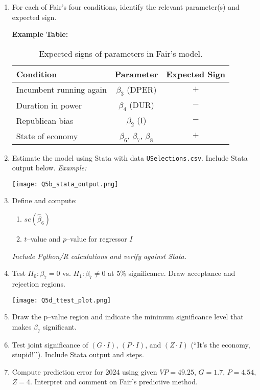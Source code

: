\documentclass[12pt,a4paper]{article}
\begin{document}
\begin{enumerate}[label=(\alph*)]
  \item For each of Fair’s four conditions, identify the relevant parameter(s) and expected sign.

  \textbf{Example Table:}
  \begin{table}[h!]\centering
  \begin{tabular}{lcc}
  \hline
  Condition & Parameter & Expected Sign \\
  \hline
  Incumbent running again & $\beta_3$ (DPER) & $+$ \\
  Duration in power & $\beta_4$ (DUR) & $-$ \\
  Republican bias & $\beta_2$ (I) & $-$ \\
  State of economy & $\beta_6$, $\beta_7$, $\beta_8$ & $+$ \\
  \hline
  \end{tabular}
  \caption{Expected signs of parameters in Fair’s model.}
  \end{table}

  \item Estimate the model using Stata with data \texttt{USelections.csv}. Include Stata output below.  
  \textit{Example:}
  \begin{center}
  \texttt{[image: Q5b\_stata\_output.png]}
  \end{center}

  \item Define and compute:
  \begin{enumerate}[label=(\roman*)]
    \item $se(\hat{\beta}_6)$  
    \item $t$–value and $p$–value for regressor $I$
  \end{enumerate}
  \textit{Include Python/R calculations and verify against Stata.}

  \item Test $H_0:\beta_7=0$ vs. $H_1:\beta_7\neq 0$ at 5\% significance.  
  Draw acceptance and rejection regions.
  \begin{center}
  \texttt{[image: Q5d\_ttest\_plot.png]}
  \end{center}

  \item Draw the p–value region and indicate the minimum significance level that makes $\beta_7$ significant.  
  \item Test joint significance of $(G\cdot I)$, $(P\cdot I)$, and $(Z\cdot I)$ (``It’s the economy, stupid!’’).  
  Include Stata output and steps.

  \item Compute prediction error for 2024 using given $V\!P=49.25$, $G=1.7$, $P=4.54$, $Z=4$.  
  Interpret and comment on Fair’s predictive method.
\end{enumerate}
\end{document}
